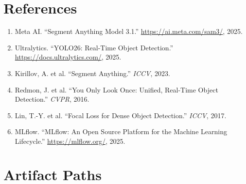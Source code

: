 \documentclass[a4paper,11pt]{article}
\begin{document}
\section*{References}

\begin{enumerate}[leftmargin=1.5cm, itemsep=2pt]
  \item Meta AI. ``Segment Anything Model 3.1.'' \url{https://ai.meta.com/sam3/}, 2025.
  \item Ultralytics. ``YOLO26: Real-Time Object Detection.'' \url{https://docs.ultralytics.com/}, 2025.
  \item Kirillov, A. et al. ``Segment Anything.'' \emph{ICCV}, 2023.
  \item Redmon, J. et al. ``You Only Look Once: Unified, Real-Time Object Detection.'' \emph{CVPR}, 2016.
  \item Lin, T.-Y. et al. ``Focal Loss for Dense Object Detection.'' \emph{ICCV}, 2017.
  \item MLflow. ``MLflow: An Open Source Platform for the Machine Learning Lifecycle.'' \url{https://mlflow.org/}, 2025.
\end{enumerate}

\appendix

\section{Artifact Paths}
\end{document}

